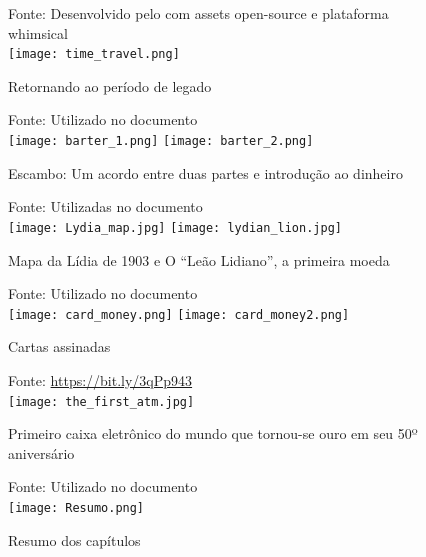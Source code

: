 \documentclass[aspectratio=43,8pt]{beamer}%
\begin{document}
\begin{frame}[noframenumbering]
	\begin{figure}
		\centering
		{\footnotesize Fonte: Desenvolvido pelo com assets open-source e plataforma whimsical}\\
		\texttt{[image: time\_travel.png]}
		\caption{Retornando ao período de legado}
	\end{figure}
\end{frame}
\begin{frame}[noframenumbering]
	\begin{figure}
		\centering
		{\footnotesize Fonte: Utilizado no documento}\\
		\texttt{[image: barter\_1.png]}
		\texttt{[image: barter\_2.png]}
		\caption{Escambo: Um acordo entre duas partes e introdução ao dinheiro}
	\end{figure}
\end{frame}
\begin{frame}[noframenumbering]
	\begin{figure}
		\centering
		{\footnotesize Fonte: Utilizadas no documento}\\
		\texttt{[image: Lydia\_map.jpg]}
		\texttt{[image: lydian\_lion.jpg]}
		\caption{Mapa da Lídia de 1903 e O ``Leão Lidiano'', a primeira moeda}
	\end{figure}
\end{frame}
\begin{frame}[noframenumbering]
	\begin{figure}
		\centering
		{\footnotesize Fonte: Utilizado no documento}\\
		\texttt{[image: card\_money.png]}
		\texttt{[image: card\_money2.png]}
		\caption{Cartas assinadas}
	\end{figure}
\end{frame}
\begin{frame}[noframenumbering]
	\begin{figure}
		\centering
		{\footnotesize Fonte: \url{https://bit.ly/3qPp943}}\\
		\texttt{[image: the\_first\_atm.jpg]}
		\caption{Primeiro caixa eletrônico do mundo que tornou-se ouro em seu 50º aniversário}
	\end{figure}
\end{frame}
\begin{frame}[noframenumbering]
		\begin{figure}
		\centering
		{\footnotesize Fonte: Utilizado no documento}\\
		\texttt{[image: Resumo.png]}
		\caption{Resumo dos capítulos}
	\end{figure}
\end{frame}
\end{document}
